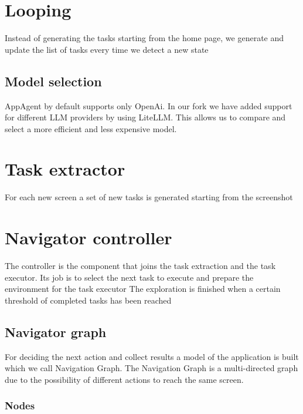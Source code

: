 \section{Looping}\label{looping}

Instead of generating the tasks starting from the home page, we generate
and update the list of tasks every time we detect a new state

\subsection{Model selection}\label{model-selection}

AppAgent by default supports only OpenAi. In our fork we have added
support for different LLM providers by using LiteLLM. This allows us to
compare and select a more efficient and less expensive model.

\section{Task extractor}\label{task-extractor}

For each new screen a set of new tasks is generated starting from the
screenshot

\section{Navigator controller}\label{navigator-controller}

The controller is the component that joins the task extraction and the
task executor. Its job is to select the next task to execute and prepare
the environment for the task executor The exploration is finished when a
certain threshold of completed tasks has been reached

\subsection{Navigator graph}\label{navigator-graph}

For deciding the next action and collect results a model of the
application is built which we call Navigation Graph. The Navigation
Graph is a multi-directed graph due to the possibility of different
actions to reach the same screen.

\subsubsection{Nodes}\label{nodes}

